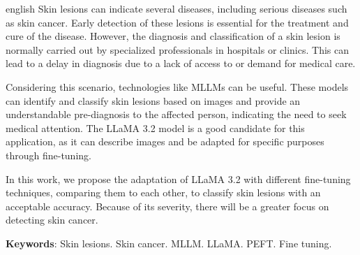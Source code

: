 \begin{resumo}[Abstract]
	\SingleSpacing
	\begin{otherlanguage*}{english}
		Skin lesions can indicate several diseases, including serious diseases such as skin cancer. Early detection of these lesions is essential for the treatment
		and cure of the disease. However, the diagnosis and classification of a skin lesion is normally carried out by specialized professionals in hospitals or clinics.
		This can lead to a delay in diagnosis due to a lack of access to or demand for medical care.

		Considering this scenario, technologies like \acp{MLLM} can be useful. These models can identify and classify skin lesions based on images and provide an
		understandable pre-diagnosis to the affected person, indicating the need to seek medical attention. The \ac{LLaMA} 3.2 model  is a good candidate for this
		application, as it can describe images and be adapted for specific purposes through fine-tuning.

		In this work, we propose the adaptation of \ac{LLaMA} 3.2 with different fine-tuning techniques, comparing them to each other, to classify skin lesions with an
		acceptable accuracy. Because of its severity, there will be a greater focus on detecting skin cancer.

		\textbf{Keywords}: Skin lesions. Skin cancer. MLLM. LLaMA. PEFT. Fine tuning.
	\end{otherlanguage*}
\end{resumo}

{
\hypersetup{hidelinks}

\listoffigures

\imprimirlistadesiglas

\tableofcontents*
\cleardoublepage
}
